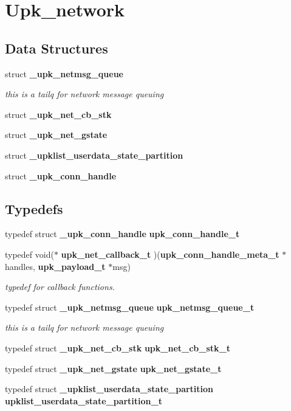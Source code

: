 \section{Upk\_\-network}
\label{group__upk__network}
\subsection*{Data Structures}
\begin{DoxyCompactItemize}
\item 
struct {\bf \_\-upk\_\-netmsg\_\-queue}
\begin{DoxyCompactList}\small\item\em this is a tailq for network message queuing \end{DoxyCompactList}\item 
struct {\bf \_\-upk\_\-net\_\-cb\_\-stk}
\item 
struct {\bf \_\-upk\_\-net\_\-gstate}
\item 
struct {\bf \_\-upklist\_\-userdata\_\-state\_\-partition}
\item 
struct {\bf \_\-upk\_\-conn\_\-handle}
\end{DoxyCompactItemize}
\subsection*{Typedefs}
\begin{DoxyCompactItemize}
\item 
typedef struct {\bf \_\-upk\_\-conn\_\-handle} {\bf upk\_\-conn\_\-handle\_\-t}
\item 
typedef void($\ast$ {\bf upk\_\-net\_\-callback\_\-t} )({\bf upk\_\-conn\_\-handle\_\-meta\_\-t} $\ast$handles, {\bf upk\_\-payload\_\-t} $\ast$msg)
\begin{DoxyCompactList}\small\item\em typedef for callback functions. \end{DoxyCompactList}\item 
typedef struct {\bf \_\-upk\_\-netmsg\_\-queue} {\bf upk\_\-netmsg\_\-queue\_\-t}
\begin{DoxyCompactList}\small\item\em this is a tailq for network message queuing \end{DoxyCompactList}\item 
typedef struct {\bf \_\-upk\_\-net\_\-cb\_\-stk} {\bf upk\_\-net\_\-cb\_\-stk\_\-t}
\item 
typedef struct {\bf \_\-upk\_\-net\_\-gstate} {\bf upk\_\-net\_\-gstate\_\-t}
\item 
typedef struct {\bf \_\-upklist\_\-userdata\_\-state\_\-partition} {\bf upklist\_\-userdata\_\-state\_\-partition\_\-t}
\end{DoxyCompactItemize}

